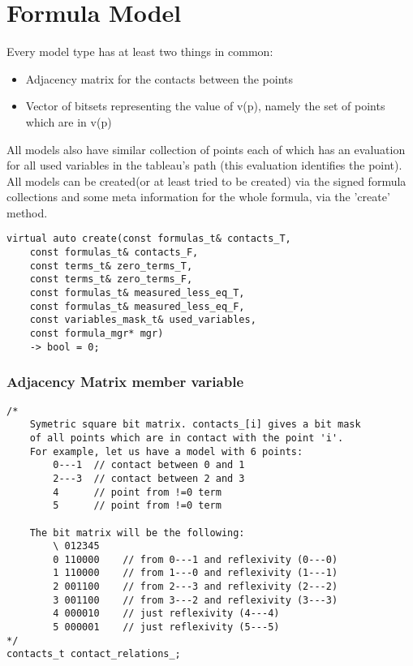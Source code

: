 \documentclass{article}
\begin{document}
	\section{Formula Model}
		Every model type has at least two things in common:
		\begin{itemize}
			\item Adjacency matrix for the contacts between the points
			\item Vector of bitsets representing the value of v(p), namely the set of points which are in v(p)
		\end{itemize}

		All models also have similar collection of points each of which has an evaluation for all 
		used variables in the tableau's path (this evaluation identifies the point).
		\newline
		All models can be created(or at least tried to be created) via the signed formula collections and 
		some meta information for the whole formula, via the 'create' method.
		\begin{lstlisting}
virtual auto create(const formulas_t& contacts_T, 
	const formulas_t& contacts_F, 
	const terms_t& zero_terms_T,
	const terms_t& zero_terms_F, 
	const formulas_t& measured_less_eq_T, 
	const formulas_t& measured_less_eq_F, 
	const variables_mask_t& used_variables, 
	const formula_mgr* mgr)
    -> bool = 0;
		\end{lstlisting}

		\subsubsection*{Adjacency Matrix member variable}
			\begin{lstlisting}
/*
    Symetric square bit matrix. contacts_[i] gives a bit mask
    of all points which are in contact with the point 'i'.
    For example, let us have a model with 6 points:
        0---1  // contact between 0 and 1
        2---3  // contact between 2 and 3
        4      // point from !=0 term
        5      // point from !=0 term

    The bit matrix will be the following:
        \ 012345
        0 110000    // from 0---1 and reflexivity (0---0)
        1 110000    // from 1---0 and reflexivity (1---1)
        2 001100    // from 2---3 and reflexivity (2---2)
        3 001100    // from 3---2 and reflexivity (3---3)
        4 000010    // just reflexivity (4---4)
        5 000001    // just reflexivity (5---5)
*/
contacts_t contact_relations_;
			\end{lstlisting}
\end{document}
